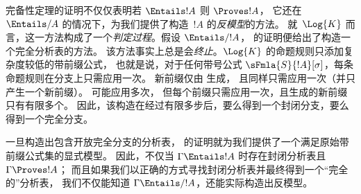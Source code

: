 \documentclass[../../../include/open-logic-section]{subfiles}
\begin{document}


\begin{explain}
  完备性定理的证明不仅仅表明若 $\Entails !A$ 则 $\Proves !A$，
  它还在 $\Entails/ A$ 的情况下，为我们提供了构造~$!A$ 的\emph{反模型}的方法。
  就~$\Log{K}$ 而言，这一方法构成了一个\emph{判定过程}。假设 $\Entails/ !A$，
   的证明便给出了构造一个完全分析表的方法。
  该方法事实上总是会\emph{终止}。$\Log{K}$ 的命题规则只添加复杂度较低的带前缀公式，
  也就是说，对于任何带号公式 $\sFmla{S}{!A}[\sigma]$，每条命题规则在分支上只需应用一次。
  新前缀仅由
  生成，
  且同样只需应用一次（并只产生一个新前缀）。
  可能应用多次，
  但每个前缀只需应用一次，且生成的新前缀只有有限多个。
  因此，该构造在经过有限多步后，要么得到一个封闭分支，要么得到一个完全分支。

  一旦构造出包含开放完全分支的分析表，
   的证明就为我们提供了一个满足原始带前缀公式集的显式模型。
  因此，不仅当 $\Gamma \Entails !A$ 时存在封闭分析表且 $\Gamma \Proves !A$；
  而且如果我们以正确的方式寻找封闭分析表并最终得到一个“完全的”分析表，
  我们不仅能知道 $\Gamma \Entails/ !A$，还能实际构造出反模型。
\end{explain}
\end{document}
